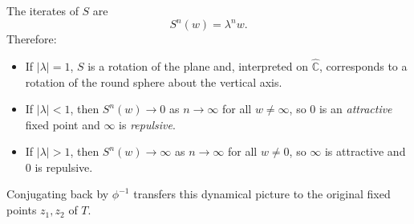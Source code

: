 \begin{problem}
The iterates of $S$ are
\[
S^{n}(w) = \lambda^{n}w.
\]
Therefore:
\begin{itemize}
	\item If $|\lambda|=1$, $S$ is a rotation of the plane and, interpreted on
	$\widehat{\mathbb{C}}$, corresponds to a rotation of the round
	sphere about the vertical axis.
	\item If $|\lambda|<1$, then $S^{n}(w)\to 0$ as $n\to\infty$ for all
	$w\neq\infty$, so $0$ is an \emph{attractive} fixed point and
	$\infty$ is \emph{repulsive}.
	\item If $|\lambda|>1$, then $S^{n}(w)\to\infty$ as $n\to\infty$ for all
	$w\neq 0$, so $\infty$ is attractive and $0$ is repulsive.
\end{itemize}
Conjugating back by $\phi^{-1}$ transfers this dynamical picture to the
original fixed points $z_{1},z_{2}$ of $T$.
\end{problem}

